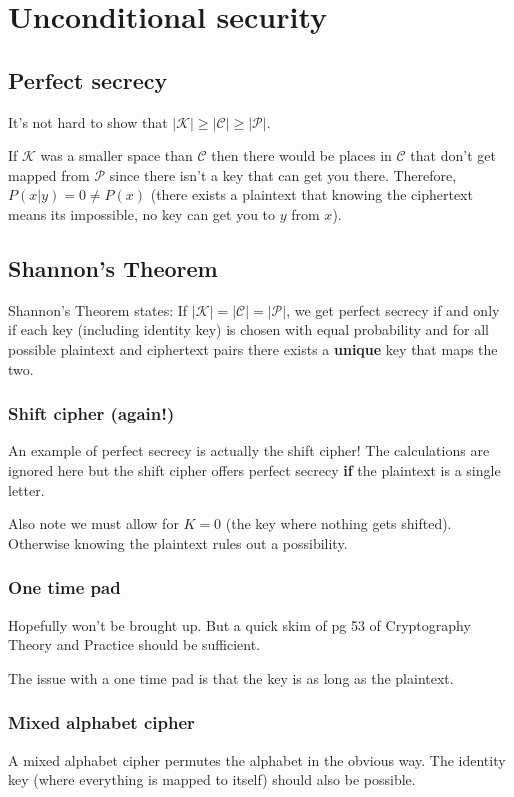 \documentclass{report}
\begin{document}
\chapter{Unconditional security}
\section{Perfect secrecy}
It's not hard to show that
$|\mathscr{K}| \geq |\mathscr{C}| \geq |\mathscr{P}|$.

If $\mathscr{K}$ was a
smaller space than $\mathscr{C}$ then there would be places in $\mathscr{C}$
that don't get mapped from $\mathscr{P}$ since there isn't a key that can
get you there. Therefore, $P(x|y) = 0 \neq P(x)$ (there exists a plaintext
that knowing the ciphertext means its impossible, no key can get you to $y$
from $x$).

\section{Shannon's Theorem}
Shannon's Theorem states: If $|\mathscr{K}| = |\mathscr{C}| = |\mathscr{P}|$,
we get perfect secrecy if and only if each key (including identity key)
is chosen with equal probability and for all possible plaintext and
ciphertext pairs there exists a \textbf{unique} key that maps the two.

\subsection{Shift cipher (again!)}
An example of perfect secrecy is actually the shift cipher! The calculations
are ignored here but the shift cipher offers perfect secrecy \textbf{if}
the plaintext is a single letter.

Also note we must allow for $K = 0$ (the key where nothing gets shifted).
Otherwise knowing the plaintext rules out a possibility.

\subsection{One time pad}
Hopefully won't be brought up. But a quick skim of pg 53 of Cryptography
Theory and Practice should be sufficient.

The issue with a one time pad is that the key is as long as the plaintext.

\subsection{Mixed alphabet cipher}
A mixed alphabet cipher permutes the alphabet in the obvious way. The
identity key (where everything is mapped to itself) should also be possible.
\end{document}
